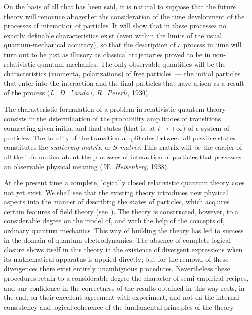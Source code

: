 On the basis of all that has been said, it is natural to suppose that the future theory will renounce altogether the consideration of the time development of the processes of interaction of particles. It will show that in these processes no exactly definable characteristics exist (even within the limits of the usual quantum-mechanical accuracy), so that the description of a process in time will turn out to be just as illusory as classical trajectories proved to be in non-relativistic quantum mechanics. The only observable quantities will be the characteristics (momenta, polarizations) of free particles~--- the initial particles that enter into the interaction and the final particles that have arisen as a result of the process (\emph{L.~D.~Landau, R.~Peierls}, 1930).

The characteristic formulation of a problem in relativistic quantum theory consists in the determination of the probability amplitudes of transitions connecting given initial and final states (that is, at $t \to \mp\infty$) of a system of particles. The totality of the transition amplitudes between all possible states constitutes the \emph{scattering matrix}, or \emph{$S$-matrix}. This matrix will be the carrier of all the information about the processes of interaction of particles that possesses an observable physical meaning (\emph{W.~Heisenberg}, 1938).

At the present time a complete, logically closed relativistic quantum theory does not yet exist. We shall see that the existing theory introduces new physical aspects into the manner of describing the states of particles, which acquires certain features of field theory (see~). The theory is constructed, however, to a considerable degree on the model of, and with the help of the concepts of, ordinary quantum mechanics. This way of building the theory has led to success in the domain of quantum electrodynamics. The absence of complete logical closure shows itself in this theory in the existence of divergent expressions when its mathematical apparatus is applied directly; but for the removal of these divergences there exist entirely unambiguous procedures. Nevertheless these procedures retain to a considerable degree the character of semi-empirical recipes, and our confidence in the correctness of the results obtained in this way rests, in the end, on their excellent agreement with experiment, and not on the internal consistency and logical coherence of the fundamental principles of the theory.

